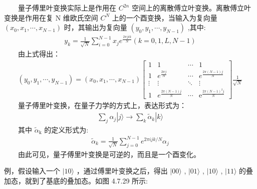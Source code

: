 \documentclass[a4paper,11pt,english]{sphinxmanual}
\let\sphinxpxdimen\pdfpxdimen\else\newdimen\sphinxpxdimen
\begin{document}
\sphinxAtStartPar
  量子傅里叶变换实际上是作用在  \(C^{2 n}\) 空间上的离散傅立叶变换。离散傅立叶变换是作用在复  \(\mathrm{N}\) 维欧氏空间  \(C^{N}\) 上的一个酉变换，当输入为复向量  \(\left(x_{0}, x_{1}, \cdots, x_{N-1}\right)\) 时，其输出为复向量  \(\left(y_{0}, y_{1}, \cdots, y_{N-1}\right)\) ,其中:
\begin{equation*}
\begin{split}y_{k}=\frac{1}{\sqrt{N}} \sum_{i=0}^{N-1} x_{j} e^{\frac{2 \pi j i k}{N}}(k=0,1, L, N-1)\end{split}
\end{equation*}
\sphinxAtStartPar
  由上式得出：
\begin{equation*}
\begin{split}\left(y_{0}, y_{1}, \cdots, y_{N-1}\right)=\left(x_{0}, x_{1}, \cdots, x_{N-1}\right)\left[\begin{array}{cccc} 1 & 1 & \cdots & 1 \\ 1 & e^{\frac{2 \pi j}{N}} & \cdots & e^{\frac{2 \pi(N-1) j}{N}} \\ \vdots & \vdots & \ddots & \vdots \\ 1 & e^{\frac{2 \pi(N-1) j}{N}} & \cdots & \mathrm{e}^{\frac{2 \pi(N-1)^{2}j}{N}} \end{array}\right] \frac{1}{\sqrt{N}}\end{split}
\end{equation*}
\sphinxAtStartPar
  量子傅里叶变换，在量子力学的方式上，表达形式为：
\begin{equation*}
\begin{split}\sum_{j} \alpha_{j}|j\rangle \rightarrow \sum_{k} \tilde{\alpha}_{k}|k\rangle\end{split}
\end{equation*}
\sphinxAtStartPar
  其中  \(\tilde{\alpha}_{\mathrm{k}}\) 的定义形式为:
\begin{equation*}
\begin{split}\tilde{\alpha}_{k}=\frac{1}{\sqrt{N}} \sum_{j=0}^{N-1} e^{2 \pi i j k / N} \alpha_{j}\end{split}
\end{equation*}
\sphinxAtStartPar
  由此可见，量子傅里叶变换是可逆的，而且是一个酉变化。

\sphinxAtStartPar
例，假设输入一个  \(|10\rangle\) ，通过傅里叶变换之后，得出 \(|00\rangle\) , \(|01\rangle\) , \(|10\rangle\) , \(|11\rangle\) 的叠加态，就到了基底的叠加态。如图 4.7.29 所示:

\noindent{\hspace*{\fill}\sphinxincludegraphics[width=500\sphinxpxdimen]{{4.7.29}.png}\hspace*{\fill}}
\end{document}
